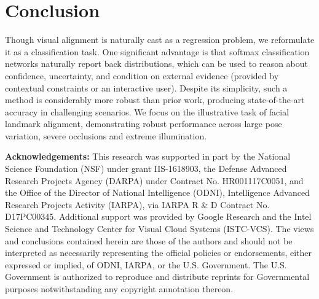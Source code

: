 \documentclass[letterpaper]{article} %
\begin{document}
\section{Conclusion}
\setcounter{secnumdepth}{2}
Though visual alignment is naturally cast as a regression problem, we reformulate it as a classification task. One significant advantage is that softmax classification networks naturally report back distributions, which can be used to reason about confidence, uncertainty, and condition on external evidence (provided by contextual constraints or an interactive user). Despite its simplicity, such a method is considerably more robust than prior work, producing state-of-the-art accuracy in challenging scenarios. We focus on the illustrative task of facial landmark alignment, demonstrating robust performance across large pose variation, severe occlusions and extreme illumination. 


{\bf Acknowledgements:}
This research was supported in part by the National Science Foundation (NSF) under grant IIS-1618903, the Defense Advanced Research Projects Agency (DARPA) under Contract No. HR001117C0051, and the Office of the Director of National Intelligence (ODNI), Intelligence Advanced Research Projects Activity (IARPA), via IARPA R \& D Contract No. D17PC00345. Additional support was provided by Google Research and the Intel Science and Technology Center for Visual Cloud Systems (ISTC-VCS). The views and conclusions contained herein are those of the authors and should not be interpreted as necessarily representing the official policies or endorsements, either expressed or implied, of ODNI, IARPA, or the U.S. Government. The U.S. Government is authorized to reproduce and distribute reprints for Governmental purposes notwithstanding any copyright annotation thereon.



\end{document}
